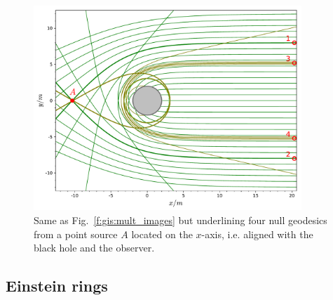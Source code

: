 \begin{figure}
\centerline{\includegraphics[width=0.9\textwidth]{ges_images_aligned.pdf}}
\caption[]{\label{f:gis:images_aligned} \footnotesize
Same as Fig.~\ref{f:gis:mult_images} but underlining four null geodesics
from a point source $A$ located on the $x$-axis, i.e.
aligned with the black hole and the observer.}
\end{figure}


\subsection{Einstein rings}

